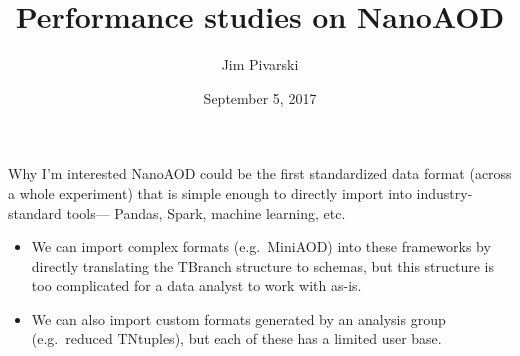 \documentclass{beamer}
\title[2017-09-05-nanoaod-xpog]{Performance studies on NanoAOD}
\author{Jim Pivarski}
\institute{Princeton University -- DIANA}
\date{September 5, 2017}
\begin{document}

\begin{frame}
  \titlepage
\end{frame}




\begin{frame}{Why I'm interested}
\vspace{0.5 cm}
NanoAOD could be the first standardized data format (across a whole experiment) that is simple enough to directly import into industry-standard tools--- Pandas, Spark, machine learning, etc.

\vspace{0.3 cm}
\begin{itemize}\setlength{\itemsep}{0.5 cm}
\item<2-> We can import complex formats (e.g.\ MiniAOD) into these frameworks by directly translating the TBranch structure to schemas, but this structure is too complicated for a data analyst to work with as-is.

\item<3-> We can also import custom formats generated by an analysis group (e.g.\ reduced TNtuples), but each of these has a limited user base.
\end{itemize}

\vspace{0.2 cm}
\end{frame}
\end{document}
